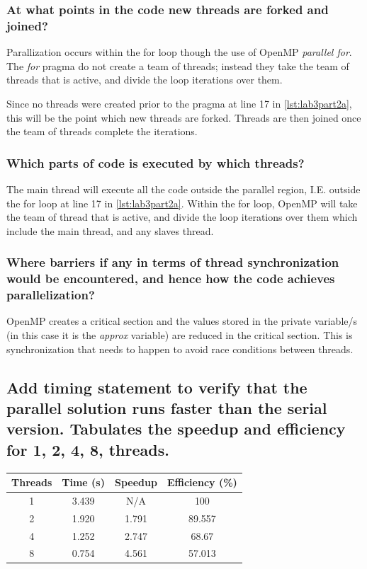 \subsubsection{At what points in the code new threads are forked and joined?}
Parallization occurs within the for loop though the use of OpenMP \emph{parallel 
for}. The \emph{for} pragma do not create a team of threads; instead they take
the team of threads that is active, and divide the loop iterations over them.

Since no threads were created prior to the pragma at line 17 in \cref{lst:lab3part2a},
this will be the point which new threads are forked. Threads are then joined
once the team of threads complete the iterations.

\subsubsection{Which parts of code is executed by which threads?}

The main thread will execute all the code outside the parallel region, I.E.
outside the for loop at line 17 in \cref{lst:lab3part2a}. Within the for loop,
OpenMP will take the team of thread that is active, and divide the loop iterations
over them which include the main thread, and any slaves thread.

\subsubsection{Where barriers if any in terms of thread synchronization would be
encountered, and hence how the code achieves parallelization?}

OpenMP creates a critical section and the values stored in  the private variable/s
(in this case it is the \emph{approx} variable) are reduced in the critical section.
This is synchronization that needs to happen to avoid race conditions between threads.

\subsection{Add timing statement to verify that the parallel solution runs faster
than the serial version. Tabulates the speedup and efficiency for 1, 2, 4, 8, threads.}

\begin{center}
\begin{tabular}{|| c | c | c | c ||}
	\hline
	Threads & Time (s) & Speedup & Efficiency (\%) \\ [0.5ex]
	\hline 
	1 & 3.439 & N/A & 100 \\
	2 & 1.920 & 1.791 & 89.557 \\
	4 & 1.252 & 2.747 & 68.67 \\
	8 & 0.754 & 4.561 & 57.013 \\
	\hline
\end{tabular}
\end{center}

